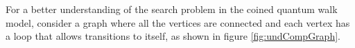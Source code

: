 \documentclass[../../dissertation.tex]{subfiles}
\begin{document}
For a better understanding of the search problem in the coined quantum walk model, consider a graph where all the vertices are connected and each vertex has a loop that allows transitions to itself, as shown in figure \ref{fig:undCompGraph}. 
%
%                    
\end{document}
